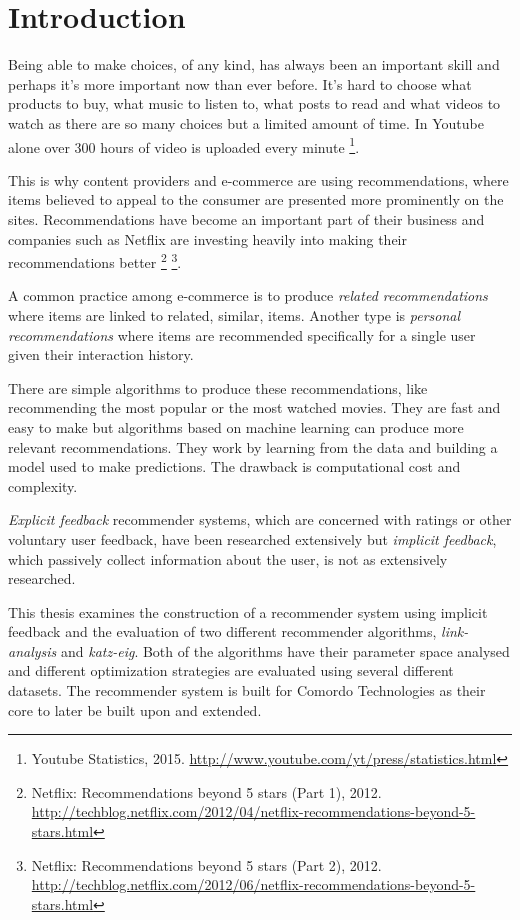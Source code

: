 
\section{Introduction}\label{sec:intro:intro}

Being able to make choices, of any kind, has always been an important skill and perhaps it's more important now than ever before. It's hard to choose what products to buy, what music to listen to, what posts to read and what videos to watch as there are so many choices but a limited amount of time. In Youtube alone over 300 hours of video is uploaded every minute
\footnote{Youtube Statistics, 2015. \url{http://www.youtube.com/yt/press/statistics.html}}.

This is why content providers and e-commerce are using recommendations, where items believed to appeal to the consumer are presented more prominently on the sites. Recommendations have become an important part of their business and companies such as Netflix are investing heavily into making their recommendations better
\footnote{
Netflix: Recommendations beyond 5 stars (Part 1), 2012.
\url{http://techblog.netflix.com/2012/04/netflix-recommendations-beyond-5-stars.html}
}
\footnote{
Netflix: Recommendations beyond 5 stars (Part 2), 2012.
\url{http://techblog.netflix.com/2012/06/netflix-recommendations-beyond-5-stars.html}
}.

A common practice among e-commerce is to produce \textit{related recommendations} where items are linked to related, similar, items. Another type is \textit{personal recommendations} where items are recommended specifically for a single user given their interaction history.

There are simple algorithms to produce these recommendations, like recommending the most popular or the most watched movies. They are fast and easy to make but algorithms based on machine learning can produce more relevant recommendations. They work by learning from the data and building a model used to make predictions. The drawback is computational cost and complexity.

\textit{Explicit feedback} recommender systems, which are concerned with ratings or other voluntary user feedback, have been researched extensively but \textit{implicit feedback}, which passively collect information about the user, is not as extensively researched. \citep{hu2008collaborative, bobadilla2013recommender}

This thesis examines the construction of a recommender system using implicit feedback and the evaluation of two different recommender algorithms, \textit{link-analysis} and \textit{katz-eig}. Both of the algorithms have their parameter space analysed and different optimization strategies are evaluated using several different datasets. The recommender system is built for Comordo Technologies as their core to later be built upon and extended.

